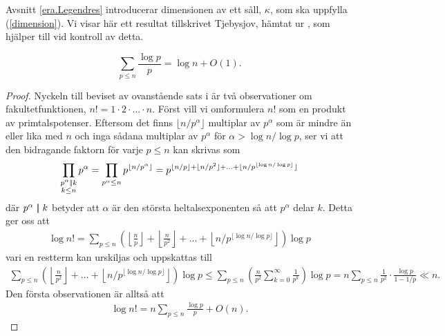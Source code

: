 
Avsnitt \ref{era.Legendres} introducerar dimensionen av ett såll, \(\kappa\), som ska uppfylla (\ref{dimension}). Vi visar här ett resultat tillskrivet Tjebysjov, hämtat ur \cite[Sats 1.4.3]{cojocarumurty}, som hjälper till vid kontroll av detta.
\begin{theorem} \label{APDX:THM1.4.3}
    \[\sum_{p \leq n} \frac{\log p}{p} = \log n + O(1). \]
\end{theorem}
\begin{proof}
Nyckeln till beviset av ovanstående sats i \cite{cojocarumurty} är två observationer om fakultetfunktionen, \(n! = 1 \cdot 2 \cdot ... \cdot n\). Först vill vi omformulera \(n!\) som en produkt av primtalspotenser. Eftersom det finns \(\lfloor n / p^\alpha \rfloor\) multiplar av \(p^\alpha\) som är mindre än eller lika med $n$ och inga sådana multiplar av \(p^\alpha\) för \(\alpha > \log n / \log p\), ser vi att den bidragande faktorn för varje $p \leq n$ kan skrivas som 
\begin{align*}
    \prod_{\substack{p^\alpha \mid\!\mid k \\ k \leq n}} p^\alpha = \prod_{p^\alpha \leq n} p^{\lfloor n/p^{\alpha} \rfloor} = p^{\lfloor n/p \rfloor + \lfloor n/p^2 \rfloor + ... + \lfloor n / p^{\lfloor \log n / \log p \rfloor} \rfloor}
\end{align*}
där \(p^\alpha \mid\!\mid k\) betyder att \(\alpha\) är den största heltalsexponenten så att $p^\alpha$ delar $k$. Detta ger oss att 
\begin{align*}
    \log n! = %
    \sum_{p \leq n} \left(\left\lfloor\frac{n}{p} \right\rfloor + \left\lfloor \frac{n}{p^2} \right\rfloor + ... + \left\lfloor n / p^{\lfloor \log n / \log p \rfloor} \right\rfloor\right) \log p
\end{align*}
vari en restterm kan urskiljas och uppskattas till
\begin{align*}
    \sum_{p \leq n} \left(\left\lfloor \frac{n}{p^2} \right\rfloor + ... + \left\lfloor n / p^{\lfloor \log n / \log p \rfloor} \right\rfloor\right) \log p \leq
    \sum_{p \leq n} \left( \frac{n}{p^2}  \sum_{k=0}^\infty \frac{1}{p^k} \right) \log p
    = n \sum_{p \leq n} \frac{1}{p^2} \cdot \frac{\log p}{1 - 1/p} \ll n.
\end{align*} %
Den första observationen är alltså att
\begin{align} \label{APDX:obser1Thm1.4.3}
    \log n! = n \sum_{p \leq n} \frac{\log p}{p} + O(n).
\end{align}


\end{proof}
